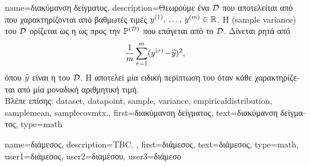 {name={\foreignlanguage{greek}{διακύμανση δείγματος}}, 
	description={\foreignlanguage{greek}{Θεωρούμε ένα}  $\mathcal{D}$ \foreignlanguage{greek}{που αποτελείται από}  
		 \foreignlanguage{greek}{που χαρακτηρίζονται από βαθμωτές τιμές
		$y^{(1)}, \,\ldots, \,y^{(m)} 
		\in \mathbb{R}$. Η}  
		(sample variance) \foreignlanguage{greek}{του $\mathcal{D}$ ορίζεται ως η}  \foreignlanguage{greek}{ως προς 
		την}  $\mathbb{P}^{(\mathcal{D})}$ \foreignlanguage{greek}{που επάγεται από το $\mathcal{D}$. 
		Δίνεται ρητά από 
		$$\frac{1}{m} \sum_{r=1}^{m} (y^{(r)}\!-\!\widehat{y})^2,$$ 
		όπου $\widehat{y}$ είναι η}  \foreignlanguage{greek}{του $\mathcal{D}$. Η} 
		  \foreignlanguage{greek}{αποτελεί μία ειδική περίπτωση του}  
		\foreignlanguage{greek}{όταν κάθε}  \foreignlanguage{greek}{χαρακτηρίζεται από μία μοναδική αριθμητική τιμή}.
		\\
		\foreignlanguage{greek}{Βλέπε επίσης:} \gls{dataset}, \gls{datapoint}, \gls{sample}, \gls{variance}, \gls{empiricaldistribution}, 
		\gls{samplemean}, \gls{samplecovmtx}.},
	first={\foreignlanguage{greek}{διακύμανση δείγματος}},
	text={\foreignlanguage{greek}{διακύμανση δείγματος}},
	type=math
}

{name={\foreignlanguage{greek}{διάμεσος}},
	description={TBC. }, 
	first={\foreignlanguage{greek}{διάμεσος}}, 
	text={\foreignlanguage{greek}{διάμεσος}},
	type=math,
	user1={\foreignlanguage{greek}{διάμεσος}}, %
	user2={\foreignlanguage{greek}{διαμέσου}}, %
	user3={\foreignlanguage{greek}{διάμεσο}} %
}

